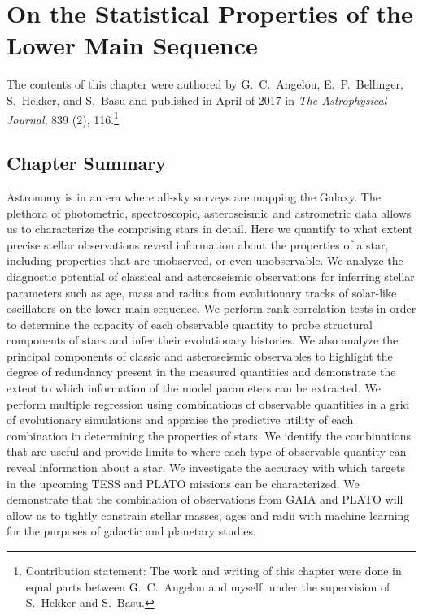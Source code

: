 %
%
%
%
%
%
%
%
%
%

%
%

%

%
%


%

%

%
%
%
%
%
%

%
%

%
%

%

%
%
%

%
\chapter{On the Statistical Properties of the Lower Main Sequence}
\label{chap:statistical}

The contents of this chapter were authored 
%
by G.~C.~Angelou, E.~P.~Bellinger, S.~Hekker, and S.~Basu and published in April of 2017 in \emph{The Astrophysical Journal}, 839 (2), 116.\footnote{Contribution statement: The work and writing of this chapter were done in equal parts between G.~C.~Angelou and myself, under the supervision of S.~Hekker and S.~Basu.} 
\nocite{2017apj...839..116a} 

%
%
%
%
%
%

%
%
%
%
%


%
%
%
%
%

\section*{Chapter Summary}
Astronomy is in an era where all-sky surveys are mapping the Galaxy. 
The plethora of photometric, spectroscopic, asteroseismic and astrometric data allows us to characterize the comprising stars in detail.  
Here we quantify to what extent precise stellar observations reveal information about the properties of a star, including properties that are unobserved, or even unobservable. 
We analyze the diagnostic potential of classical and asteroseismic observations for inferring stellar parameters such as age, mass and radius from evolutionary tracks of solar-like oscillators on the lower main sequence. 
We perform rank correlation tests in order to determine the capacity of each observable quantity to probe structural components of stars and infer their evolutionary histories. We also analyze the principal components of classic and asteroseismic observables to highlight the degree of redundancy present in the measured quantities and demonstrate the extent to which information of the model parameters can be extracted.
We perform multiple regression using combinations of observable quantities in a grid of evolutionary simulations and appraise the predictive utility of each combination in determining the properties of stars.
We identify the combinations that are useful and provide limits to where each type of observable quantity can reveal information about a star. We investigate the accuracy with which targets in the upcoming TESS and PLATO missions can be characterized.  We demonstrate that the combination of observations from GAIA and PLATO will allow us to tightly constrain stellar masses, ages and radii with machine learning for the purposes of galactic and planetary studies.
%


